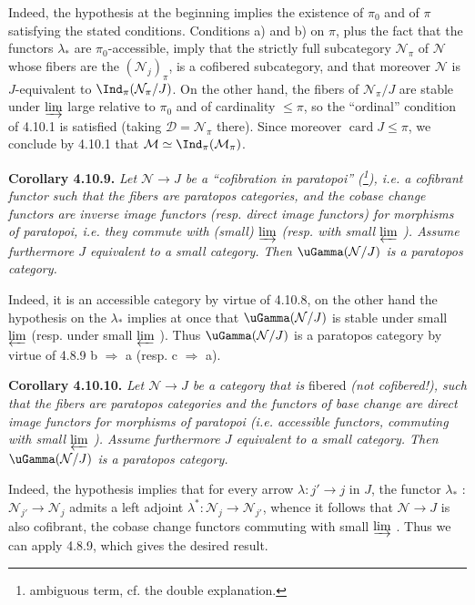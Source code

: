 Indeed, the hypothesis at the beginning implies the existence of $\pi_0$ and of $\pi$ satisfying the stated conditions. Conditions a) and b) on $\pi$, plus the fact that the functors $\lambda_*$ are $\pi_0$-accessible, imply that the strictly full subcategory $\mathcal{N}_\pi$ of $\mathcal{N}$ whose fibers are the $(\mathcal{N}_j)_\pi$, is a cofibered subcategory, and that moreover $\mathcal{N}$ is $J$-equivalent to $\Ind_\pi(\mathcal{N}_\pi/J)$. On the other hand, the fibers of $\mathcal{N}_\pi/J$ are stable under $\varinjlim$ large relative to $\pi_0$ and of cardinality $\leqslant \pi$, so the ``ordinal'' condition of 4.10.1 is satisfied (taking $\mathcal{D} = \mathcal{N}_\pi$ there). Since moreover $\operatorname{card} J \leqslant \pi$, we conclude by 4.10.1 that $\mathcal{M} \simeq \Ind_\pi(\mathcal{M}_\pi)$.


\textbf{Corollary 4.10.9.} \textit{Let $\mathcal{N} \longrightarrow J$ be a ``cofibration in paratopoi'' (\footnote{ambiguous term, cf. the double explanation.}), i.e. a cofibrant functor such that the fibers are paratopos categories, and the cobase change functors are inverse image functors (resp. direct image functors) for morphisms of paratopoi, i.e. they commute with (small) $\varinjlim$ (resp. with small $\varprojlim$ ). Assume furthermore $J$ equivalent to a small category. Then $\uGamma(\mathcal{N}/J)$ is a paratopos category.}

Indeed, it is an accessible category by virtue of 4.10.8, on the other hand the hypothesis on the $\lambda_*$ implies at once that $\uGamma(\mathcal{N}/J)$ is stable under small $\varprojlim$ (resp. under small $\varprojlim$
). Thus $\uGamma(\mathcal{N}/J)$ is a paratopos category by virtue of 4.8.9 b $\Longrightarrow$ a (resp. c $\Longrightarrow$ a).

\textbf{Corollary 4.10.10.} \textit{Let $\mathcal{N} \longrightarrow J$ be a category that is} fibered \textit{(not cofibered!), such that the fibers are paratopos categories and the functors}  \textit{of base change are direct image functors for morphisms of paratopoi (i.e. accessible functors, commuting with small $\varprojlim$ ). Assume furthermore $J$ equivalent to a small category. Then $\uGamma(\mathcal{N}/J)$ is a paratopos category.}

Indeed, the hypothesis implies that for every arrow $\lambda : j' \longrightarrow j$ in $J$, the functor $\lambda_*$ : $\mathcal{N}_{j'} \longrightarrow \mathcal{N}_j$ admits a left adjoint $\lambda^* : \mathcal{N}_j \longrightarrow \mathcal{N}_{j'}$, whence it follows that $\mathcal{N} \longrightarrow J$ is also cofibrant, the cobase change functors commuting with small $\varinjlim$ . Thus we can apply 4.8.9, which gives the desired result.

